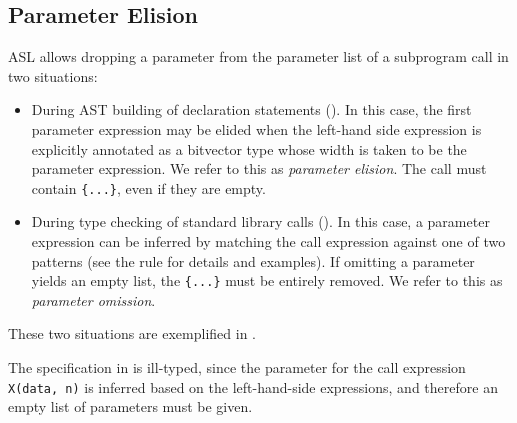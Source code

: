 \begin{mathpar}
\end{mathpar}

\subsection{Parameter Elision\label{sec:ParameterElision}}

ASL allows dropping a parameter from the parameter list of a subprogram call
in two situations:
\begin{itemize}
  \item During AST building of declaration statements
        ().
        In this case, the first parameter expression may be elided when the left-hand side
        expression is explicitly annotated as a bitvector type whose width is taken to be the parameter expression.
        We refer to this as \emph{parameter elision}.
        The call must contain \verb|{...}|, even if they are empty.
  \item During type checking of standard library calls ().
        In this case, a parameter expression can be inferred by matching the call expression
        against one of two patterns (see the rule for details and examples).
        If omitting a parameter yields an empty list, the \verb|{...}| must be entirely removed.
        We refer to this as \emph{parameter omission}.
\end{itemize}

These two situations are exemplified in .

The specification in  is ill-typed,
since the parameter for the call expression \verb|X(data, n)| is inferred based on the left-hand-side
expressions, and therefore an empty list of parameters must be given.

